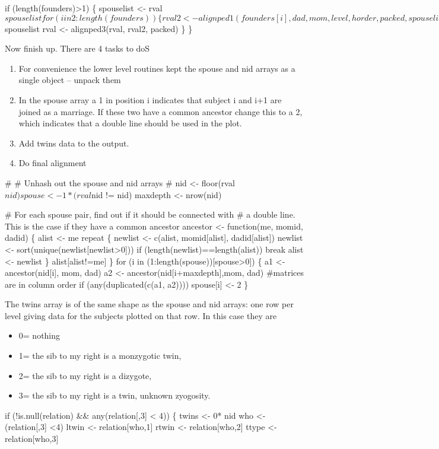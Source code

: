 \documentclass{article}
\begin{document}
if (length(founders)>1) \{
    spouselist <- rval$spouselist
    for (i in 2:length(founders)) \{
        rval2 <- alignped1(founders[i], dad, mom,
                           level, horder, packed, spouselist)
        spouselist <- rval2$spouselist
        rval <- alignped3(rval, rval2, packed)
        \}
    \}
\nwendcode{}\nwdocspar

Now finish up.  
There are 4 tasks to doS
\begin{enumerate}
  \item For convenience the lower level routines kept the spouse
    and nid arrays as a single object -- unpack them
  \item In the spouse array a 1 in position i indicates that subject
    i and i+1 are joined as a marriage.  If these two have a common
    ancestor change this to a 2, which indicates that a double line
    should be used in the plot.
  \item Add twins data to the output.
  \item Do final alignment
\end{enumerate}

\nwenddocs{}\endmoddef
#
# Unhash out the spouse and nid arrays
#
nid    <- floor(rval$nid)
spouse <- 1*(rval$nid != nid)
maxdepth <- nrow(nid)

# For each spouse pair, find out if it should be connected with
#  a double line.  This is the case if they have a common ancestor
ancestor <- function(me, momid, dadid) \{
    alist <- me
    repeat \{
        newlist <- c(alist, momid[alist], dadid[alist])
        newlist <- sort(unique(newlist[newlist>0]))
        if (length(newlist)==length(alist)) break
        alist <- newlist
        \}
    alist[alist!=me]
    \}
for (i in (1:length(spouse))[spouse>0]) \{
    a1 <- ancestor(nid[i], mom, dad)
    a2 <- ancestor(nid[i+maxdepth],mom, dad)  #matrices are in column order
    if (any(duplicated(c(a1, a2)))) spouse[i] <- 2
    \}
\nwendcode{}\nwdocspar

The twins array is of the same shape as the spouse and nid arrays:
one row per level giving data for the subjects plotted on that row.
In this case they are
\begin{itemize}
  \item 0= nothing
  \item 1= the sib to my right is a monzygotic twin, 
  \item 2= the sib to my right is a dizygote,
  \item 3= the sib to my right is a twin, unknown zyogosity.
\end{itemize}
\nwenddocs{}\plusendmoddef
if (!is.null(relation) && any(relation[,3] < 4)) \{
    twins <- 0* nid
    who  <- (relation[,3] <4)
    ltwin <- relation[who,1]
    rtwin <- relation[who,2]
    ttype <- relation[who,3]
    
\end{document}
